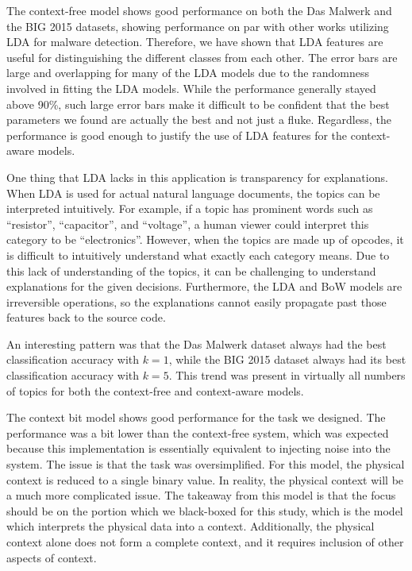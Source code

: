 \documentclass[../stegner_thesis.tex]{subfiles}
\begin{document}
\par The context-free model shows good performance on both the Das Malwerk and
the BIG 2015 datasets, showing performance on par with other works utilizing
LDA for malware detection.
Therefore, we have shown that LDA features are useful for distinguishing the
different classes from each other.
The error bars are large and overlapping for many of the LDA models due to the
randomness involved in fitting the LDA models.
While the performance generally stayed above 90\%, such large error bars make
it difficult to be confident that the best parameters we found are actually the
best and not just a fluke.
Regardless, the performance is good enough to justify the use of LDA features
for the context-aware models.

\par One thing that LDA lacks in this application is transparency for
explanations.
When LDA is used for actual natural language documents, the topics can be
interpreted intuitively.
For example, if a topic has prominent words such as ``resistor'',
``capacitor'', and ``voltage'', a human viewer could interpret this category to
be ``electronics''.
However, when the topics are made up of opcodes, it is difficult to intuitively
understand what exactly each category means.
Due to this lack of understanding of the topics, it can be challenging to
understand explanations for the given decisions.
Furthermore, the LDA and BoW models are irreversible operations, so the
explanations cannot easily propagate past those features back to the source
code.

\par An interesting pattern was that the Das Malwerk dataset always had the
best classification accuracy with $k=1$, while the BIG 2015 dataset always
had its best classification accuracy with $k=5$.
This trend was present in virtually all numbers of topics for both the
context-free and context-aware models.

\par The context bit model shows good performance for the task we designed.
The performance was a bit lower than the context-free system, which was
expected because this implementation is essentially equivalent to injecting
noise into the system.
The issue is that the task was oversimplified.
For this model, the physical context is reduced to a single binary value.
In reality, the physical context will be a much more complicated issue.
The takeaway from this model is that the focus should be on the portion which
we black-boxed for this study, which is the model which interprets the physical
data into a context.
Additionally, the physical context alone does not form a complete context, and
it requires inclusion of other aspects of context.
\end{document}
